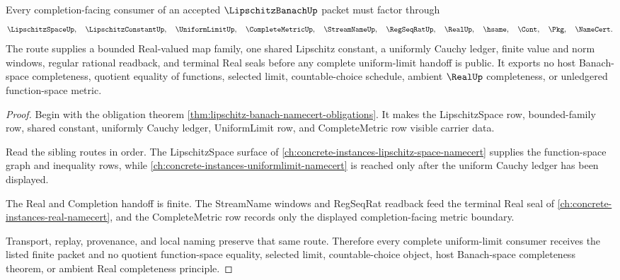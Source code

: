 \begin{theorem}
\label{thm:lipschitz-banach-complete-uniform-limit-route}
Every completion-facing consumer of an accepted $\LipschitzBanachUp$ packet must factor through
$$
\LipschitzSpaceUp,\quad \LipschitzConstantUp,\quad \UniformLimitUp,\quad \CompleteMetricUp,\quad \StreamNameUp,\quad \RegSeqRatUp,\quad \RealUp,\quad \hsame,\quad \Cont,\quad \Pkg,\quad \NameCert .
$$
The route supplies a bounded Real-valued map family, one shared Lipschitz constant, a uniformly Cauchy ledger, finite value and norm windows, regular rational readback, and terminal Real seals before any complete uniform-limit handoff is public. It exports no host Banach-space completeness, quotient equality of functions, selected limit, countable-choice schedule, ambient $\RealUp$ completeness, or unledgered function-space metric.
\end{theorem}
\begin{proof}
Begin with the obligation theorem \autoref{thm:lipschitz-banach-namecert-obligations}. It makes the LipschitzSpace row, bounded-family row, shared constant, uniformly Cauchy ledger, UniformLimit row, and CompleteMetric row visible carrier data.

Read the sibling routes in order. The LipschitzSpace surface of \autoref{ch:concrete-instances-lipschitz-space-namecert} supplies the function-space graph and inequality rows, while \autoref{ch:concrete-instances-uniformlimit-namecert} is reached only after the uniform Cauchy ledger has been displayed.

The Real and Completion handoff is finite. The StreamName windows and RegSeqRat readback feed the terminal Real seal of \autoref{ch:concrete-instances-real-namecert}, and the CompleteMetric row records only the displayed completion-facing metric boundary.

Transport, replay, provenance, and local naming preserve that same route. Therefore every complete uniform-limit consumer receives the listed finite packet and no quotient function-space equality, selected limit, countable-choice object, host Banach-space completeness theorem, or ambient Real completeness principle.
\end{proof}


